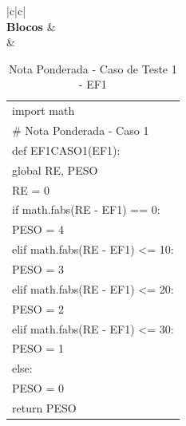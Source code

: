 \begin{table}[htb!]
	\caption{Nota Ponderada - Caso de Teste 1 - EF1}
	\centering
	\begin{tabular}{|c|c|}
		\hline
		 \\ \hline
		\textbf{Blocos} &  \\ \hline
		 & \begin{tabular}[c]{@{}l@{}}import math \\ \# Nota Ponderada - Caso 1\\ def EF1CASO1(EF1):\\ \quad global RE, PESO\\ \quad RE = 0\\ \quad	if math.fabs(RE - EF1) == 0:\\	\quad \quad PESO = 4\\ \quad elif math.fabs(RE - EF1) <= 10:\\ \quad \quad PESO = 3\\	\quad elif math.fabs(RE - EF1) <= 20:\\ \quad \quad	PESO = 2\\ \quad elif math.fabs(RE - EF1) <= 30:\\ \quad \quad PESO = 1\\ \quad	else:\\ \quad \quad	PESO = 0\\ return PESO
	 \end{tabular}  \\ \hline
	\end{tabular}
	\label{tabela:OTA_C1EF1}
\end{table}

